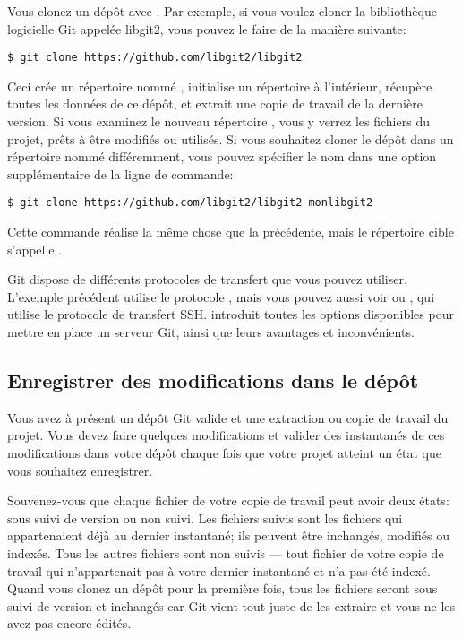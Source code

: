 Vous clonez un dépôt avec .
Par exemple, si vous voulez cloner la bibliothèque logicielle Git appelée libgit2, vous pouvez le faire de la manière suivante:
\begin{Schunk}
\begin{Verbatim}
$ git clone https://github.com/libgit2/libgit2
\end{Verbatim}
\end{Schunk}

Ceci crée un répertoire nommé , initialise un répertoire  à l'intérieur, récupère toutes les données de ce dépôt, et extrait une copie de travail de la dernière version.
Si vous examinez le nouveau répertoire , vous y verrez les fichiers du projet, prêts à être modifiés ou utilisés.
Si vous souhaitez cloner le dépôt dans un répertoire nommé différemment, vous pouvez spécifier le nom dans une option supplémentaire de la ligne de commande:
\begin{Schunk}
\begin{Verbatim}
$ git clone https://github.com/libgit2/libgit2 monlibgit2
\end{Verbatim}
\end{Schunk}

Cette commande réalise la même chose que la précédente, mais le répertoire cible s'appelle .

Git dispose de différents protocoles de transfert que vous pouvez utiliser.
L'exemple précédent utilise le protocole , mais vous pouvez aussi voir  ou , qui utilise le protocole de transfert SSH.
 introduit toutes les options disponibles pour mettre en place un serveur Git, ainsi que leurs avantages et inconvénients.

\subsection{Enregistrer des modifications dans le dépôt}

Vous avez à présent un dépôt Git valide et une extraction ou copie de travail du projet.
Vous devez faire quelques modifications et valider des instantanés de ces modifications dans votre dépôt chaque fois que votre projet atteint un état que vous souhaitez enregistrer.

Souvenez-vous que chaque fichier de votre copie de travail peut avoir deux états: sous suivi de version ou non suivi.
Les fichiers suivis sont les fichiers qui appartenaient déjà au dernier instantané; ils peuvent être inchangés, modifiés ou indexés.
Tous les autres fichiers sont non suivis --- tout fichier de votre copie de travail qui n'appartenait pas à votre dernier instantané et n'a pas été indexé.
Quand vous clonez un dépôt pour la première fois, tous les fichiers seront sous suivi de version et inchangés car Git vient tout juste de les extraire et vous ne les avez pas encore édités.

